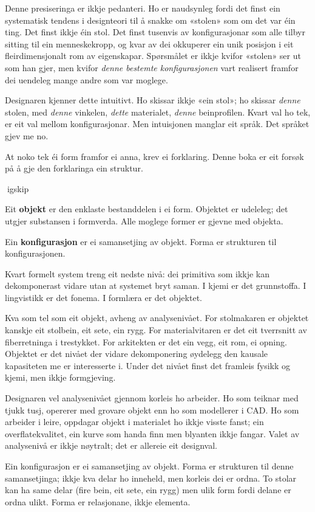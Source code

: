 Denne presiseringa er ikkje pedanteri. Ho er naudsynleg fordi det finst ein systematisk tendens i designteori til å snakke om «stolen» som om det var éin ting. Det finst ikkje éin stol. Det finst tusenvis av konfigurasjonar som alle tilbyr sitting til ein menneskekropp, og kvar av dei okkuperer ein unik posisjon i eit fleirdimensjonalt rom av eigenskapar. Spørsmålet er ikkje kvifor «stolen» ser ut som han gjer, men kvifor \textit{denne bestemte konfigurasjonen} vart realisert framfor dei uendeleg mange andre som var moglege.

Designaren kjenner dette intuitivt. Ho skissar ikkje «ein stol»; ho skissar \textit{denne} stolen, med \textit{denne} vinkelen, \textit{dette} materialet, \textit{denne} beinprofilen. Kvart val ho tek, er eit val mellom konfigurasjonar. Men intuisjonen manglar eit språk. Det språket gjev me no.

At noko tek éi form framfor ei anna, krev ei forklaring. Denne boka er eit forsøk på å gje den forklaringa ein struktur.

igskip

Eit \textbf{objekt} er den enklaste bestanddelen i ei form. Objektet er udeleleg; det utgjer substansen i formverda. Alle moglege former er gjevne med objekta.

Ein \textbf{konfigurasjon} er ei samansetjing av objekt. Forma er strukturen til konfigurasjonen.

Kvart formelt system treng eit nedste nivå: dei primitiva som ikkje kan dekomponerast vidare utan at systemet bryt saman. I kjemi er det grunnstoffa. I lingvistikk er det fonema. I formlæra er det objektet.

Kva som tel som eit objekt, avheng av analysenivået. For stolmakaren er objektet kanskje eit stolbein, eit sete, ein rygg. For materialvitaren er det eit tverrsnitt av fiberretninga i trestykket. For arkitekten er det ein vegg, eit rom, ei opning. Objektet er det nivået der vidare dekomponering øydelegg den kausale kapasiteten me er interesserte i. Under det nivået finst det framleis fysikk og kjemi, men ikkje formgjeving.

Designaren vel analysenivået gjennom korleis ho arbeider. Ho som teiknar med tjukk tusj, opererer med grovare objekt enn ho som modellerer i CAD. Ho som arbeider i leire, oppdagar objekt i materialet ho ikkje visste fanst; ein overflatekvalitet, ein kurve som handa finn men blyanten ikkje fangar. Valet av analysenivå er ikkje nøytralt; det er allereie eit designval.

Ein konfigurasjon er ei samansetjing av objekt. Forma er strukturen til denne samansetjinga; ikkje kva delar ho inneheld, men korleis dei er ordna. To stolar kan ha same delar (fire bein, eit sete, ein rygg) men ulik form fordi delane er ordna ulikt. Forma er relasjonane, ikkje elementa.

